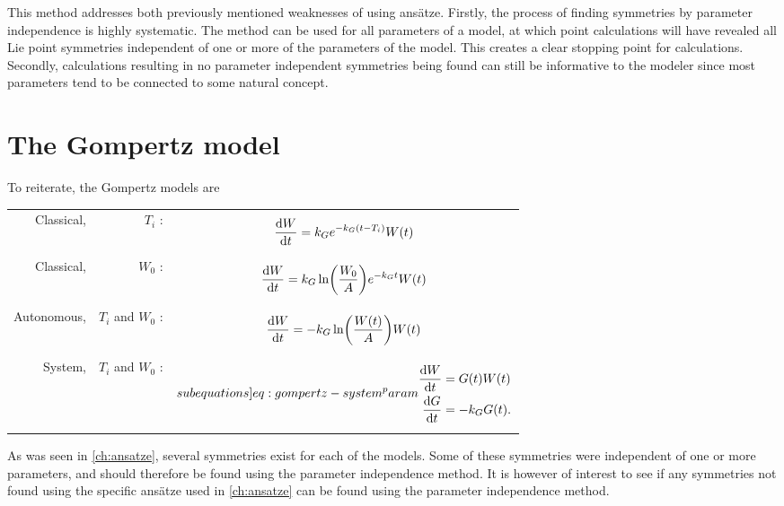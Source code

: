 This method addresses both previously mentioned weaknesses of using ansätze.
Firstly, the process of finding symmetries by parameter independence is highly systematic.
The method can be used for all parameters of a model, at which point calculations will have revealed all Lie point symmetries independent of one or more of the parameters of the model.
This creates a clear stopping point for calculations.
Secondly, calculations resulting in no parameter independent symmetries being found can still be informative to the modeler since most parameters tend to be connected to some natural concept.

\section{The Gompertz model}
To reiterate, the Gompertz models are\par\noindent
\begin{tabularx}{\linewidth}{rrM}
  Classical, & \(T_i\) :&
  \begin{minipage}{\linewidth}
    \begin{equation}
      \diff{W}{t} = k_G e^{-k_G (t - T_i)} W(t) \label{eq:gompertz-classical-ti^param}
    \end{equation}
  \end{minipage}\tabularnewline
  Classical, & \(W_0\) :&
  \begin{minipage}{\linewidth}
    \begin{equation}
      \diff{W}{t} = k_G \ln\left(\frac{W_0}{A}\right)e^{-k_G t} W(t) \label{eq:gompertz-classical-w0^param}
    \end{equation}
  \end{minipage}\tabularnewline
  Autonomous, & \(T_i\) and \(W_0\) :&
  \begin{minipage}{\linewidth}
    \begin{equation}
      \diff{W}{t} = -k_G \ln\left(\frac{W(t)}{A}\right) W(t) \label{eq:gompertz-autonomous^param}
    \end{equation}
  \end{minipage}\tabularnewline
  System, & \(T_i\) and \(W_0\) :&
  \begin{minipage}{\linewidth}%
    {\begin{subequations} \label[subequations]{eq:gompertz-system^param}
      \begin{align}
        \diff{W}{t} &= G(t) W(t) \label{eq:gompertz-system-a^param}\\
        \diff{G}{t} &= -k_G G(t). \label{eq:gompertz-system-b^param}
      \end{align}
    \end{subequations}}%
  \end{minipage}
\end{tabularx}
As was seen in \cref{ch:ansatze}, several symmetries exist for each of the models.
Some of these symmetries were independent of one or more parameters, and should therefore be found using the parameter independence method.
It is however of interest to see if any symmetries not found using the specific ansätze used in \cref{ch:ansatze} can be found using the parameter independence method.

